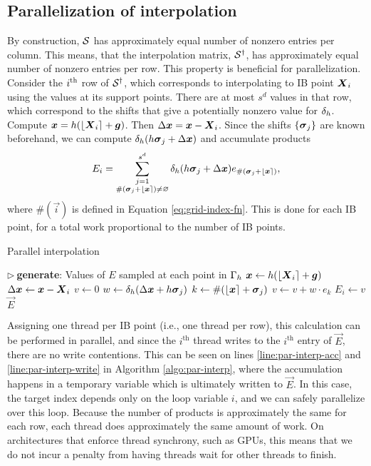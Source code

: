 \subsection{Parallelization of interpolation}

By construction, $\mathcal{S}$ has approximately equal number of nonzero entries per column.
This means, that the interpolation matrix, $\mathcal{S}^\dagger$, has approximately equal number of
nonzero entries per row. This property is beneficial for parallelization. Consider the
$i\textsuperscript{th}$ row of $\mathcal{S}^\dagger$, which corresponds to interpolating to IB point $\boldsymbol{X}_i$ using the
values at its support points. There are at most $s^d$ values in that row, which
correspond to the shifts that give a potentially nonzero value for $\delta_h$. Compute
$\boldsymbol{x}=h(\left\lfloor{\boldsymbol{X}_i}\right\rceil+\boldsymbol{g})$. Then $\Delta\boldsymbol{x}=\boldsymbol{x}-\boldsymbol{X}_i$. Since the shifts $\{\boldsymbol{\sigma}_j\}$ are
known beforehand, we can compute $\delta_h(h\boldsymbol{\sigma}_j+\Delta\boldsymbol{x})$ and accumulate products
\begin{equation*}
    E_i = \sum_{\substack{j=1\\\#(\boldsymbol{\sigma}_j+\left\lfloor{\boldsymbol{x}}\right\rceil)\neq\varnothing}}^{s^d}\delta_h(h\boldsymbol{\sigma}_j+\Delta\boldsymbol{x})e_{\#(\boldsymbol{\sigma}_j+\left\lfloor{\boldsymbol{x}}\right\rceil)},
\end{equation*}
where $\#(\vec{i})$ is defined in Equation \ref{eq:grid-index-fn}. This is done for each
IB point, for a total work proportional to the number of IB points.

\begin{algorithm}
\caption{Parallel interpolation}
\label{algo:par-interp}
\begin{algorithmic}[1]
\State $\triangleright\ $\textbf{generate}: Values of $E$ sampled at each point in $\Gamma_h$
    \State $\boldsymbol{x} \gets h(\left\lfloor{\boldsymbol{X}_i}\right\rceil+\boldsymbol{g})$
    \State $\Delta\boldsymbol{x} \gets \boldsymbol{x}-\boldsymbol{X}_i$
    \State $v \gets 0$
        \State $w \gets \delta_h(\Delta\boldsymbol{x}+h\boldsymbol{\sigma}_j)$
        \State $k \gets \#(\left\lfloor{\boldsymbol{x}}\right\rceil+\boldsymbol{\sigma}_j)$
            \State $v \gets v + w \cdot e_k$\label{line:par-interp-acc}
        \EndIf
    \EndFor
    \State $E_i \gets v$\label{line:par-interp-write}
\EndFor
\State \Return $\vec{E}$
\EndProcedure
\end{algorithmic}
\end{algorithm}

Assigning one thread per IB point (i.e., one thread per row), this calculation can be
performed in parallel, and since the $i^\text{th}$ thread writes to the $i^\text{th}$
entry of $\vec{E}$, there are no write contentions. This can be seen on lines
\ref{line:par-interp-acc} and \ref{line:par-interp-write} in Algorithm
\ref{algo:par-interp}, where the accumulation happens in a temporary variable which is
ultimately written to $\vec{E}$. In this case, the target index depends only on the loop
variable $i$, and we can safely parallelize over this loop.  Because the number of
products is approximately the same for each row, each thread does approximately the same
amount of work. On architectures that enforce thread synchrony, such as GPUs, this means
that we do not incur a penalty from having threads wait for other threads to finish.

